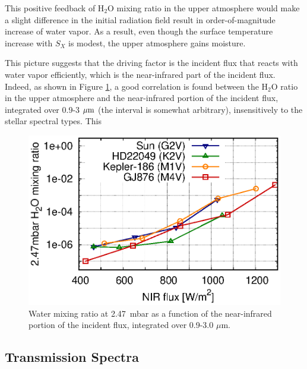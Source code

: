\documentclass[11pt,numberedappendix,twocolappendix,]{emulateapj}
\def\water{H$_2$O }
\def\preslevel{2.47}
\begin{document}
This positive feedback of \water mixing ratio in the upper atmosphere would make a slight difference in the initial radiation field result in order-of-magnitude increase of water vapor. 
As a result, even though the surface temperature increase with $S_X$ is modest, the upper atmosphere gains moisture.  

This picture suggests that the driving factor is the incident flux that reacts with water vapor efficiently, which is the near-infrared part of the incident flux. 
Indeed, as shown in Figure \ref{fig:qOH0TLS_FNIR_xH2O_247mbar}, a good correlation is found between the \water ratio in the upper atmosphere and the near-infrared portion of the incident flux, integrated over 0.9-3 $\mu {\rm m}$ (the interval is somewhat arbitrary), insensitively to the stellar spectral types. 
This 

\begin{figure}[!h]
    \begin{center}
    \includegraphics[width=\hsize]{fig/AqOH0TLS_FNIR_xH2O_247mbar.eps}
    \end{center}
\caption{Water mixing ratio at \preslevel ~mbar as a function of the near-infrared portion of the incident flux, integrated over 0.9-3.0 $\mu $m. }                                                                                                             
\label{fig:qOH0TLS_FNIR_xH2O_247mbar}
\end{figure}

\subsection{Transmission Spectra}
\label{ss:result_TransmissionSpectra}
\end{document}

